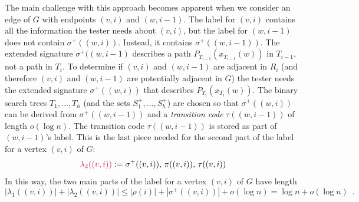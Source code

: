 \documentclass{patmorin}
\makeatletter
\renewcommand{\le}{\leqslant}
\newcommand{\defin}[1]{\emph{\textcolor{brightmaroon}{#1}}}
\def\mathcolor#1#{\@mathcolor{#1}}
\def\@mathcolor#1#2#3{%
  \protect\leavevmode
  \begingroup
    \color#1{#2}#3%
  \endgroup
}
\newcommand{\mathdefin}[1]{\mathcolor{brightmaroon}{#1}}
\makeatother
\begin{document}
  The main challenge with this approach becomes apparent when we consider an edge of $G$ with endpoints $(v,i)$ and $(w,i-1)$.  The label for $(v,i)$ contains all the information the tester needs about $(v,i)$, but the label for $(w,i-1)$ does not contain $\sigma^+((w,i))$. Instead, it contains $\sigma^+((w,i-1))$.  The extended signature $\sigma^+((w,i-1)$ describes a path $P_{T_{i-1}}(x_{T_{i-1}}(w))$ in $T_{i-1}$, not a path in $T_i$.  To determine if $(v,i)$ and $(w,i-1)$ are adjacent in $R_i$ (and therefore $(v,i)$ and $(w,i-1)$ are potentially adjacent in $G$) the tester needs the extended signature $\sigma^+((w,i))$ that describes $P_{T_i}(x_{T_i}(w))$.  The binary search trees $T_1,\ldots,T_h$ (and the sets $S^+_1,\ldots,S^+_h$) are chosen so that $\sigma^+((w,i))$ can be derived from $\sigma^+((w,i-1))$ and a \defin{transition code} \defin{$\tau((w,i-1))$} of length $o(\log n)$. The transition code $\tau((w,i-1))$ is stored as part of $(w,i-1)$'s label.
  This is the last piece needed for the second part of the label for a vertex $(v,i)$ of $G$:
  \[
    \mathdefin{\lambda_2((v,i))} := \sigma^+((v,i)),\, \pi((v,i)),\, \tau((v,i))
  \]
  In this way, the two main parts of the label for a vertex $(v,i)$ of $G$ have length
  \[
      |\lambda_1((v,i))|+|\lambda_2((v,i))|
      \le |\rho(i)| + |\sigma^+((v,i))| + o(\log n)
      = \log n + o(\log n) \enspace .
  \]










\end{document}
